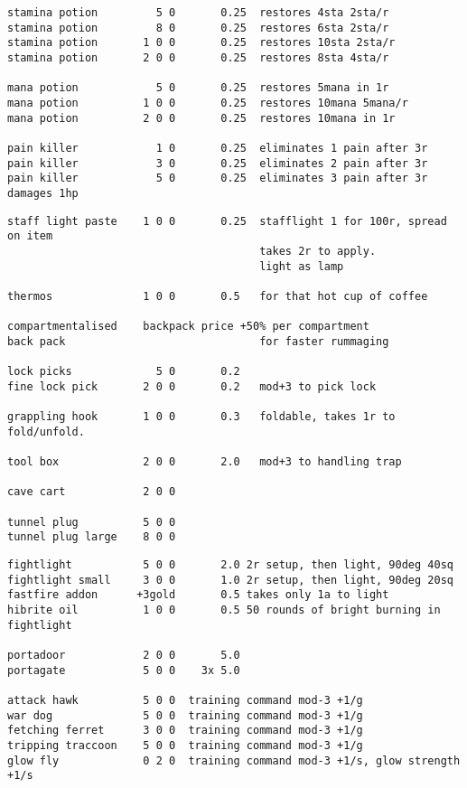 \begin{verbatim}
stamina potion         5 0       0.25  restores 4sta 2sta/r
stamina potion         8 0       0.25  restores 6sta 2sta/r
stamina potion       1 0 0       0.25  restores 10sta 2sta/r
stamina potion       2 0 0       0.25  restores 8sta 4sta/r

mana potion            5 0       0.25  restores 5mana in 1r
mana potion          1 0 0       0.25  restores 10mana 5mana/r
mana potion          2 0 0       0.25  restores 10mana in 1r

pain killer            1 0       0.25  eliminates 1 pain after 3r
pain killer            3 0       0.25  eliminates 2 pain after 3r
pain killer            5 0       0.25  eliminates 3 pain after 3r damages 1hp

\end{verbatim} \pagebreak[1] \begin{verbatim}
staff light paste    1 0 0       0.25  stafflight 1 for 100r, spread on item
                                       takes 2r to apply.
                                       light as lamp

thermos              1 0 0       0.5   for that hot cup of coffee

compartmentalised    backpack price +50% per compartment
back pack                              for faster rummaging

lock picks             5 0       0.2
fine lock pick       2 0 0       0.2   mod+3 to pick lock

grappling hook       1 0 0       0.3   foldable, takes 1r to fold/unfold.

tool box             2 0 0       2.0   mod+3 to handling trap

cave cart            2 0 0

tunnel plug          5 0 0
tunnel plug large    8 0 0

\end{verbatim} \pagebreak[1] \begin{verbatim}
fightlight           5 0 0       2.0 2r setup, then light, 90deg 40sq
fightlight small     3 0 0       1.0 2r setup, then light, 90deg 20sq
fastfire addon      +3gold       0.5 takes only 1a to light
hibrite oil          1 0 0       0.5 50 rounds of bright burning in fightlight

portadoor            2 0 0       5.0
portagate            5 0 0    3x 5.0

attack hawk          5 0 0  training command mod-3 +1/g
war dog              5 0 0  training command mod-3 +1/g
fetching ferret      3 0 0  training command mod-3 +1/g
tripping traccoon    5 0 0  training command mod-3 +1/g
glow fly             0 2 0  training command mod-3 +1/s, glow strength +1/s


\end{verbatim}
\normalsize

